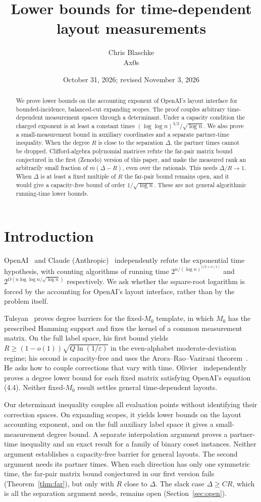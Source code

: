 \documentclass[11pt]{article}
\title{Lower bounds for time-dependent layout measurements}
\author{Chris Blaschke\\Ax0s}
\date{October 31, 2026; revised November 3, 2026}
\begin{document}
\maketitle
\begin{abstract}
We prove lower bounds on the accounting exponent of OpenAI's layout interface for bounded-incidence, balanced-cut expanding scopes. The proof couples arbitrary time-dependent measurement spaces through a determinant. Under a capacity condition the charged exponent is at least a constant times $(\log\log n)^{3/2}/\sqrt{\log n}$. We also prove a small-measurement bound in auxiliary coordinates and a separate partner-time inequality. When the degree $R$ is close to the separation $\Delta$, the partner times cannot be dropped. Clifford-algebra polynomial matrices refute the far-pair matrix bound conjectured in the first (Zenodo) version of this paper, and make the measured rank an arbitrarily small fraction of $m(\Delta-R)$, even over the rationals. This needs $\Delta/R\to1$. When $\Delta$ is at least a fixed multiple of $R$ the far-pair bound remains open, and it would give a capacity-free bound of order $1/\sqrt{\log n}$. These are not general algorithmic running-time lower bounds.
\end{abstract}
\section{Introduction}
OpenAI~\cite{openai} and Claude (Anthropic)~\cite{anthropic} independently refute the exponential time hypothesis, with counting algorithms of running time $2^{n/(\log n)^{1/2+o(1)}}$ and $2^{O(n\log\log n/\sqrt{\log n})}$ respectively. We ask whether the square-root logarithm is forced by the accounting for OpenAI's layout interface, rather than by the problem itself.

Tulsyan~\cite{tulsyan} proves degree barriers for the fixed-$M_0$ template, in which $M_0$ has the prescribed Hamming support and fixes the kernel of a common measurement matrix. On the full label space, his first bound yields $R\ge(1-o(1))\sqrt{Q\ln(1/\varepsilon)}$ in the even-alphabet moderate-deviation regime; his second is capacity-free and uses the Arora--Rao--Vazirani theorem~\cite{arv}. He asks how to couple corrections that vary with time. Olivier~\cite{olivier} independently proves a degree lower bound for each fixed matrix satisfying OpenAI's equation (4.4). Neither fixed-$M_0$ result settles general time-dependent layouts.

Our determinant inequality couples all evaluation points without identifying their correction spaces. On expanding scopes, it yields lower bounds on the layout accounting exponent, and on the full auxiliary label space it gives a small-measurement degree bound. A separate interpolation argument proves a partner-time inequality and an exact result for a family of binary coset instances. Neither argument establishes a capacity-free barrier for general layouts. The second argument needs its partner times. When each direction has only one symmetric time, the far-pair matrix bound conjectured in our first version fails (Theorem~\ref{thm:far}), but only with $R$ close to $\Delta$. The slack case $\Delta\ge CR$, which is all the separation argument needs, remains open (Section~\ref{sec:open}).
\end{document}
